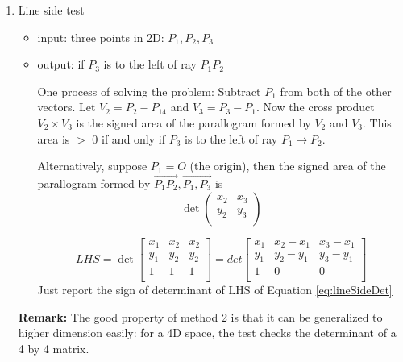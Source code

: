 \documentclass[12pt]{article}
\newcommand{\eref}[1]{Equation \ref{#1}}
\newcommand{\rmk}[1]{\par {\bf Remark: }{#1}}
\begin{document}
\begin{enumerate}[1)]
    \rmk{The good practice is make this line segment intersection test
      be a sum-routine and call an existing solver to solve the
      matrix. Don't try to inline the code}
    
    Some cases when the algorithm output False:
    \begin{itemize}
    \item $L_1$ and $L_2$ parallel but not collinear
    \item the intersection is on the extension of the two line segment
    \item the intersection is on one line segment and on the extension
      of the other.
    \end{itemize}

\item Line side test
  \begin{itemize}
  \item input: three points in 2D: $P_1, P_2, P_3$
  \item output: if $P_3$ is to the left of ray ${P_1P_2}$ 

    One process of solving the problem: Subtract $P_1$ from both of the
    other vectors.  Let $V_2 = P_2-P_14$ and $V_3 = P_3-P_1$.  Now the
    cross product $V_2 \times V_3$ is the signed area of the
    parallogram formed by $V_2$ and $V_3$.  This area is $>$ 0 if and
    only if $P_3$ is to the left of ray $P_1 \mapsto P_2$.
    
    Alternatively, suppose $P_1 = O$ (the origin), then the signed
    area of the parallogram formed by $\vec{P_1 P_2}, \vec{P_1, P_3}$
    is 
    \begin{equation}\label{eq:signArea}
      \det\begin{pmatrix}
        x_2 & x_3 \\
        y_2 & y_3 \\
      \end{pmatrix}
    \end{equation}

    \begin{equation}\label{eq:lineSideDet}
      LHS = \det\begin{bmatrix}
        x_1 & x_2 & x_2\\
        y_1 & y_2 & y_2\\
        1 & 1 & 1\\
      \end{bmatrix}
      =
      det\begin{bmatrix}
        x_1 & x_2 - x_1 & x_3 - x_1\\
        y_1 & y_2 - y_1 & y_3 - y_1\\
        1 & 0 & 0\\
        \end{bmatrix}
    \end{equation}
    Just report the sign of determinant of LHS of
    \eref{eq:lineSideDet}
  \end{itemize}
  \rmk{The good property of method 2 is that it can be generalized to
    higher dimension easily: for a 4D space, the test checks the
    determinant of a 4 by 4 matrix.}


\end{enumerate}
\end{document}
